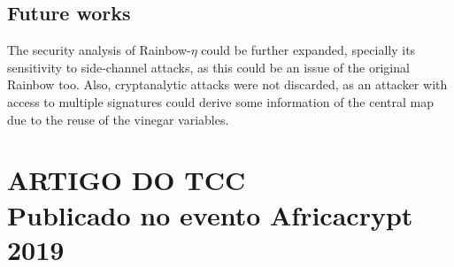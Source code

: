 \documentclass{ufsctex/ufsctex}
\begin{document}
\section{Future works}

The security analysis of Rainbow-$\eta$ could be further expanded, specially
its sensitivity to side-channel attacks, as this could be an issue of the
original Rainbow too. Also, cryptanalytic attacks were not discarded, as an
attacker with access to multiple signatures could derive some information of
the central map due to the reuse of the vinegar variables.

\apendice{}

\chapter{ARTIGO DO TCC\\Publicado no evento Africacrypt 2019}





\end{document}
